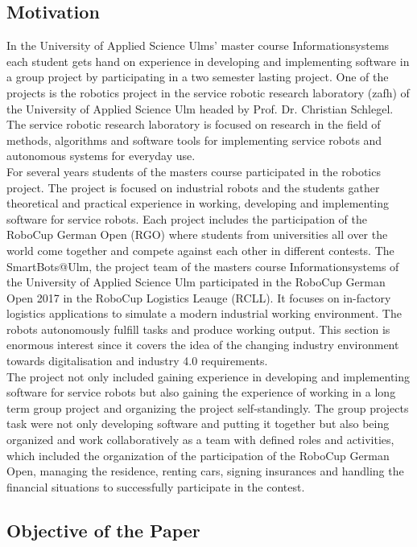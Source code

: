 \subsection{Motivation}

In the University of Applied Science Ulms' master course Informationsystems each student gets hand on experience in developing and implementing software in a group project by participating in a two semester lasting project. One of the projects is the robotics project in the service robotic research laboratory (zafh) of the University of Applied Science Ulm headed by Prof. Dr. Christian Schlegel. The service robotic research laboratory is focused on research in the field of methods, algorithms and software tools for implementing service robots and autonomous systems for everyday use. \\
For several years students of the masters course participated in the robotics project. The project is focused on industrial robots and the students gather theoretical and practical experience in working, developing and implementing software for service robots. Each project includes the participation of the RoboCup German Open (RGO) where students from universities all over the world come together and compete against each other in different contests. The SmartBots@Ulm, the project team of the masters course Informationsystems of the University of Applied Science Ulm participated in the RoboCup German Open 2017 in the RoboCup Logistics Leauge (RCLL). It focuses on in-factory logistics applications to simulate a modern industrial working environment. The robots autonomously fulfill tasks and produce working output. This section is enormous interest since it covers the idea of the changing industry environment towards digitalisation and industry 4.0 requirements. \\
The project not only included gaining experience in developing and implementing software for service robots but also gaining the experience of working in a long term group project and organizing the project self-standingly. The group projects task were not only developing software and putting it together but also being organized and work collaboratively as a team with defined roles and activities, which included the organization of the participation of the RoboCup German Open, managing the residence, renting cars, signing insurances and handling the financial situations to successfully participate in the contest. 

\subsection{Objective of the Paper}

